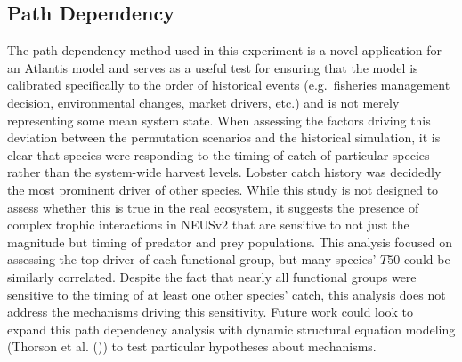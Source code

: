\documentclass[
]{article}
\begin{document}
\subsection{Path Dependency}\label{path-dependency}

The path dependency method used in this experiment is a novel application for an Atlantis model and serves as a useful test for ensuring that the model is calibrated specifically to the order of historical events (e.g.~fisheries management decision, environmental changes, market drivers, etc.) and is not merely representing some mean system state. When assessing the factors driving this deviation between the permutation scenarios and the historical simulation, it is clear that species were responding to the timing of catch of particular species rather than the system-wide harvest levels. Lobster catch history was decidedly the most prominent driver of other species. While this study is not designed to assess whether this is true in the real ecosystem, it suggests the presence of complex trophic interactions in NEUSv2 that are sensitive to not just the magnitude but timing of predator and prey populations. This analysis focused on assessing the top driver of each functional group, but many species' \(T50\) could be similarly correlated. Despite the fact that nearly all functional groups were sensitive to the timing of at least one other species' catch, this analysis does not address the mechanisms driving this sensitivity. Future work could look to expand this path dependency analysis with dynamic structural equation modeling (Thorson et al. ()) to test particular hypotheses about mechanisms.
\end{document}
